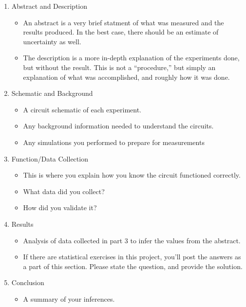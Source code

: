 \documentclass[
  letterpaper,
  DIV=11,
  numbers=noendperiod]{scrartcl}
\providecommand{\tightlist}{%
  \setlength{\itemsep}{0pt}\setlength{\parskip}{0pt}}\usepackage{longtable,booktabs,array}
\begin{document}
\begin{enumerate}
\def\labelenumi{\arabic{enumi}.}
\tightlist
\item
  Abstract and Description

  \begin{itemize}
  \tightlist
  \item
    An abstract is a very brief statment of what was measured and the
    results produced. In the best case, there should be an estimate of
    uncertainty as well.
  \item
    The description is a more in-depth explanation of the experiments
    done, but without the result. This is not a ``procedure,'' but
    simply an explanation of what was accomplished, and roughly how it
    was done.
  \end{itemize}
\item
  Schematic and Background

  \begin{itemize}
  \tightlist
  \item
    A circuit schematic of each experiment.
  \item
    Any background information needed to understand the circuits.
  \item
    Any simulations you performed to prepare for measurements
  \end{itemize}
\item
  Function/Data Collection

  \begin{itemize}
  \tightlist
  \item
    This is where you explain how you know the circuit functioned
    correctly.
  \item
    What data did you collect?
  \item
    How did you validate it?
  \end{itemize}
\item
  Results

  \begin{itemize}
  \tightlist
  \item
    Analysis of data collected in part 3 to infer the values from the
    abstract.
  \item
    If there are statistical exercises in this project, you'll post the
    answers as a part of this section. Please state the question, and
    provide the solution.
  \end{itemize}
\item
  Conclusion

  \begin{itemize}
  \tightlist
  \item
    A summary of your inferences.
  \end{itemize}
\end{enumerate}
\end{document}

